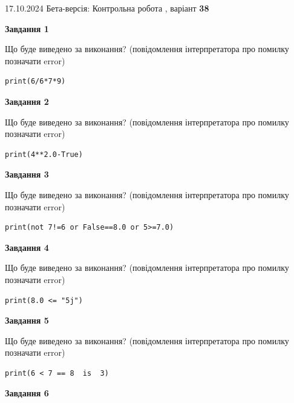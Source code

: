 \documentclass[12pt, ukrainian]{article}
\begin{document}
{\Large{17.10.2024 Бета-версія: Контрольна робота , варіант  \No \textbf { 38 }\par}}
{
\begin {large}
{\begin {center}\textbf{Завдання 1}\end {center}}

Що буде виведено за виконання? (повідомлення інтерпретатора про помилку позначати error)\par
\begin{verbatim}
print(6/6*7*9)
\end{verbatim}

{\begin {center}\textbf{Завдання 2}\end {center}}

Що буде виведено за виконання? (повідомлення інтерпретатора про помилку позначати error)\par
\begin{verbatim}
print(4**2.0-True)
\end{verbatim}

{\begin {center}\textbf{Завдання 3}\end {center}}

Що буде виведено за виконання? (повідомлення інтерпретатора про помилку позначати error)\par
\begin{verbatim}
print(not 7!=6 or False==8.0 or 5>=7.0)
\end{verbatim}

{\begin {center}\textbf{Завдання 4}\end {center}}

Що буде виведено за виконання? (повідомлення інтерпретатора про помилку позначати error)\par
\begin{verbatim}
print(8.0 <= "5j")
\end{verbatim}

{\begin {center}\textbf{Завдання 5}\end {center}}

Що буде виведено за виконання? (повідомлення інтерпретатора про помилку позначати error)\par
\begin{verbatim}
print(6 < 7 == 8  is  3)
\end{verbatim}

{\begin {center}\textbf{Завдання 6}\end {center}}


\end{large}}
\end{document}
